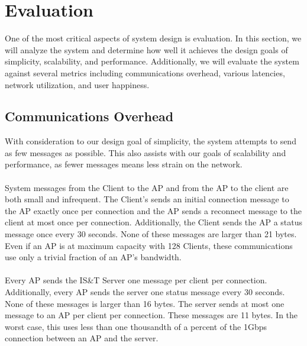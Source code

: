 \documentclass[10pt,journal,compsoc]{IEEEtran}
\begin{document}
\section{Evaluation}
		One of the most critical aspects of system design is evaluation. In this section, we will analyze the system and determine how well it achieves the design goals of simplicity, scalability, and performance. Additionally, we will evaluate the system against several metrics including communications overhead, various latencies, network utilization, and user happiness.
		
		\subsection{Communications Overhead}
		With consideration to our design goal of simplicity, the system attempts to send as few messages as possible. This also assists with our goals of scalability and performance, as fewer messages means less strain on the network.\\
		\\
		System messages from the Client to the AP and from the AP to the client are both small and infrequent. The Client's sends an initial connection message to the AP exactly once per connection and the AP sends a reconnect message to the client at most once per connection. Additionally, the Client sends the AP a status message once every 30 seconds. None of these messages are larger than 21 bytes. Even if an AP is at maximum capacity with 128 Clients, these communications use only a trivial fraction of an AP's bandwidth.\\
		\\
		Every AP sends the IS\&T Server one message per client per connection. Additionally, every AP sends the server one status message every 30 seconds. None of these messages is larger than 16 bytes. The server sends at most one message to an AP per client per connection. These messages are 11 bytes. In the worst case, this uses less than one thousandth of a percent of the 1Gbps connection between an AP and the server.
		
\end{document}
